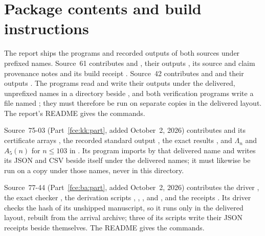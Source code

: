 \documentclass[11pt,a4paper]{article}
\numberwithin{equation}{section}
\theoremstyle{definition}\newtheorem{definition}[theorem]{Definition}
\theoremstyle{remark}\newtheorem{remark}[theorem]{Remark}
\begin{document}
\section{Package contents and build instructions}\label{fce:app:package}
The report ships the programs and recorded outputs of both sources under
prefixed names. Source~61 contributes  and
, their outputs
, its source and claim provenance notes
 and its build receipt
. Source~42 contributes
 and
 and their outputs
. The programs read and write their outputs
under the delivered, unprefixed names in a  directory beside
, and both verification programs write a file named
; they must therefore be run on separate copies in
the delivered layout. The report's README gives the commands.

Source~75-03 (Part~\ref{fce:kk:part}, added October~2, 2026) contributes
 and its certificate arrays
, the recorded standard
output , the exact
results , and
$\Lambda_n$ and $A_5(n)$ for $n\le103$ in
. Its program imports
 by that delivered name and writes its JSON and CSV
beside itself under the delivered names; it must likewise be run on a copy
under those names, never in this directory.

Source~77-44 (Part~\ref{fce:ba:part}, added October~2, 2026) contributes
the driver , the exact checker
, the derivation scripts
,
,
,
 and
, and the
receipts . Its driver checks the hash of its
unshipped manuscript, so it runs only in the delivered layout, rebuilt from
the arrival archive; three of its scripts write their JSON receipts beside
themselves. The README gives the commands.
\end{document}
